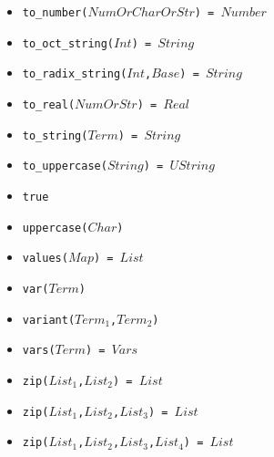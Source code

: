 \documentclass[10pt]{article}
\begin{document}
\begin{multicols}{2}
\begin{scriptsize}
\begin{itemize}
    \item \texttt{to\_number($NumOrCharOrStr$) = $Number$}
    \item \texttt{to\_oct\_string($Int$) = $String$}    
    \item \texttt{to\_radix\_string($Int$,$Base$) = $String$}
    \item \texttt{to\_real($NumOrStr$) = $Real$} 
    \item \texttt{to\_string($Term$) = $String$}        
    \item \texttt{to\_uppercase($String$) = $UString$}
    \item \texttt{true}
    \item \texttt{uppercase($Char$)} 
    \item \texttt{values($Map$) = $List$} 
    \item \texttt{var($Term$)} 
    \item \texttt{variant($Term_1$,$Term_2$)}
    \item \texttt{vars($Term$) = $Vars$}
    \item \texttt{zip($List_1$,$List_2$) = $List$} 
    \item \texttt{zip($List_1$,$List_2$,$List_3$) = $List$} 
    \item \texttt{zip($List_1$,$List_2$,$List_3$,$List_4$) = $List$} 
\end{itemize}
\end{scriptsize}

%

\end{multicols}
\end{document}
